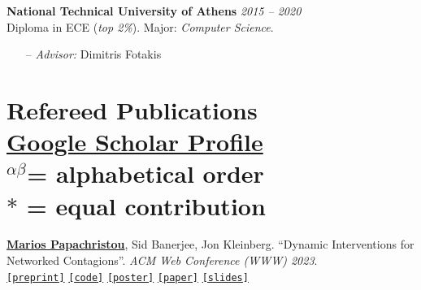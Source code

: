 \documentclass[margin]{res}
\newcommand{\field}[2]{\noindent \textbf{#1} \hfill #2 \\}
\newcommand{\alphabeticalorder}[0]{\ensuremath {^{\alpha \beta}}}
\newcommand{\specialurl}[2]{\href {#2} {\texttt{[#1]}}}
\newcommand{\preprint}[1]{\specialurl {preprint} {#1}}
\newcommand{\code}[1]{\specialurl {code} {#1}}
\newcommand{\slides}[1]{\specialurl {slides} {#1}}
\newcommand{\poster}[1]{\specialurl {poster} {#1}}
\newcommand{\paper}[1]{\specialurl {paper} {#1}}
\newcommand{\authorref}[1]{\underline {\textbf{#1}}}
\newcommand{\authorme}{\authorref{Marios Papachristou}}
\begin{document}
\begin{resume}
\field{National Technical University of Athens}  {\emph{2015 -- 2020}} 
Diploma in ECE (\emph{top 2\%}). Major: \emph{Computer Science}.
\begin{itemize}[nosep]
\item[--] \emph{Advisor:} Dimitris Fotakis

\end{itemize} 

\section{Refereed Publications\\ {
\footnotesize
\textup{\href{https://scholar.google.gr/citations?user=T12JO3MAAAAJ&hl=en}{Google Scholar Profile}} \\\alphabeticalorder  = \textup{alphabetical order} \\ $*$ = \textup{equal contribution}
}}


\begin{enumerate}[nosep, label={[P\arabic*]}]    
 
   \item \authorme, Sid Banerjee, Jon Kleinberg. ``Dynamic Interventions for Networked Contagions''. \emph{ACM Web Conference (WWW) 2023}. \\
		\preprint{https://arxiv.org/abs/2205.13394} \code{https://github.com/papachristoumarios/dynamic-clearing} \poster{https://drive.google.com/file/d/1l0TCsoZNo3NoOOHsPSh1ofctXD4ivFir/view?usp=sharing}
		\paper{https://dl.acm.org/doi/abs/10.1145/3543507.3583470}
		\slides{https://drive.google.com/file/d/1ZZ6F6PFNsBjYKFyurkwM2IbenuzXJEAs/view?usp=share_link}



\end{enumerate}
\end{resume}
\end{document}
